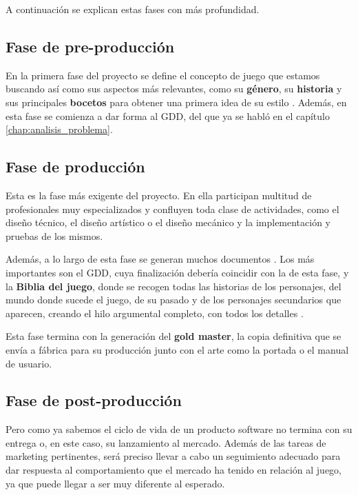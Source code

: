 A continuación se explican estas fases con más profundidad.

\subsection{Fase de pre-producción}

En la primera fase del proyecto se define el concepto de juego que estamos buscando así como sus aspectos más relevantes, como su \textbf{género}, su \textbf{historia} y sus principales \textbf{bocetos} para obtener una primera idea de su estilo \cite{rou-05}. Además, en esta fase se comienza a dar forma al \acs{GDD}, del que ya se habló en el capítulo \ref{chap:analisis_problema}.

\subsection{Fase de producción}

Esta es la fase más exigente del proyecto. En ella participan multitud de profesionales muy especializados y confluyen toda clase de actividades, como el diseño técnico, el diseño artístico o el diseño mecánico y la implementación y pruebas de los mismos. 

Además, a lo largo de esta fase se generan muchos documentos . Los más importantes son el \acs{GDD}, cuya finalización debería coincidir con la de esta fase, y la \textbf{Biblia del juego}, donde se recogen todas las historias de los personajes, del mundo donde sucede el juego, de su pasado y de los personajes secundarios que aparecen, creando el hilo argumental completo, con todos los detalles \cite{man-14}.

Esta fase termina con la generación del \textbf{gold master}, la copia definitiva que se envía a fábrica para su producción junto con el arte como la portada o el manual de usuario.

\subsection{Fase de post-producción}

Pero como ya sabemos el ciclo de vida de un producto software no termina con su entrega o, en este caso, su lanzamiento al mercado. Además de las tareas de marketing pertinentes, será preciso llevar a cabo un seguimiento adecuado para dar respuesta al comportamiento que el mercado ha tenido en relación al juego, ya que puede llegar a ser muy diferente al esperado.

